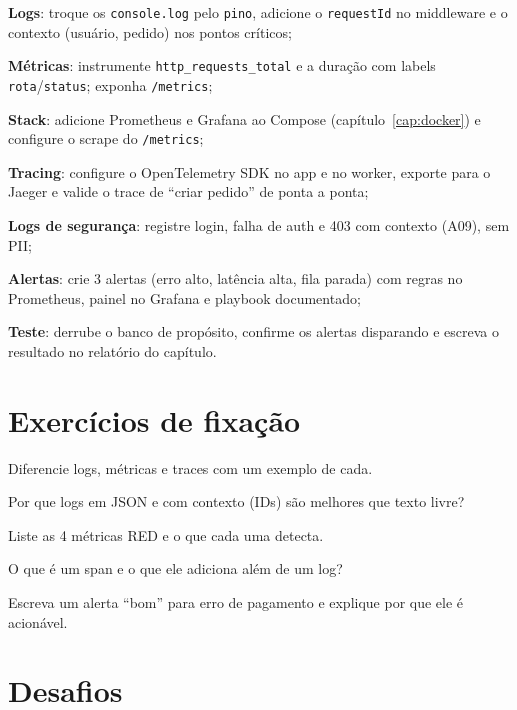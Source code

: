 \begin{passos}
  \item \textbf{Logs}: troque os \texttt{console.log} pelo \texttt{pino},
  adicione o \texttt{requestId} no middleware e o contexto (usuário, pedido)
  nos pontos críticos;
  \item \textbf{Métricas}: instrumente \texttt{http\_requests\_total} e a
  duração com labels \texttt{rota}/\texttt{status}; exponha \texttt{/metrics};
  \item \textbf{Stack}: adicione Prometheus e Grafana ao Compose
  (capítulo~\ref{cap:docker}) e configure o scrape do \texttt{/metrics};
  \item \textbf{Tracing}: configure o OpenTelemetry SDK no app e no worker,
  exporte para o Jaeger e valide o trace de ``criar pedido'' de ponta a ponta;
  \item \textbf{Logs de segurança}: registre login, falha de auth e 403 com
  contexto (A09), sem PII;
  \item \textbf{Alertas}: crie 3 alertas (erro alto, latência alta, fila
  parada) com regras no Prometheus, painel no Grafana e playbook documentado;
  \item \textbf{Teste}: derrube o banco de propósito, confirme os alertas
  disparando e escreva o resultado no relatório do capítulo.
\end{passos}

\section{Exercícios de fixação}

\begin{exercicios}
  \item Diferencie logs, métricas e traces com um exemplo de cada.
  \item Por que logs em JSON e com contexto (IDs) são melhores que texto livre?
  \item Liste as 4 métricas RED e o que cada uma detecta.
  \item O que é um span e o que ele adiciona além de um log?
  \item Escreva um alerta ``bom'' para erro de pagamento e explique por que ele é acionável.
\end{exercicios}

\section{Desafios}

